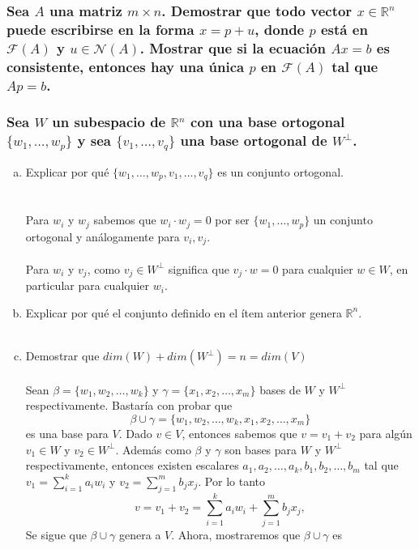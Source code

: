 \documentclass{article}
\begin{document}
\subsubsection{Sea $A$ una matriz $m \times n$. Demostrar que todo vector $x \in \mathbb{R}^n$ puede escribirse en la forma
$x = p+u$, donde $p$ está en $\mathcal{F}(A)$ y $u \in \mathcal{N}(A)$. Mostrar que si la ecuación $Ax = b$ es consistente,
entonces hay una única $p$ en $\mathcal{F}(A)$ tal que $Ap = b$.}

\subsubsection{Sea $W$ un subespacio de $\mathbb{R}^n$ con una base ortogonal $\{ w_1,\dots,w_p \}$ y sea 
$\{ v_1,\dots,v_q \}$ una base ortogonal de $W^\bot$.}
\begin{enumerate}[a.]
\item
	Explicar por qué $\{ w_1,\dots,w_p,v_1,\dots,v_q \}$ es un conjunto ortogonal. \\ \\ \\
	Para $w_i$ y $w_j$ sabemos que $w_i \cdot w_j = 0$ por ser $\{ w_1,\dots,w_p \}$ un conjunto ortogonal y análogamente
	para $v_i,v_j$. \\ \\ Para $w_i$ y $v_j$, como $v_j \in W^\bot$ significa que $v_j \cdot w = 0$ para cualquier $w \in W$,
	en particular para cualquier $w_i$. 
\item
	Explicar por qué el conjunto definido en el ítem anterior genera $\mathbb{R}^n$. \\ \\ 
\item
	Demostrar que $dim(W)+dim(W^\bot)=n = dim(V)$ \\ \\
	Sean $\beta = \{ w_1,w_2,\dots,w_k \}$ y $\gamma = \{ x_1,x_2,\dots,x_m \}$ bases de $W$ y $W^\bot$
	respectivamente. Bastaría con probar que
	\[
	\beta \cup \gamma = \{ w_1,w_2,\dots,w_k,x_1,x_2,\dots,x_m  \}
	\]
	es una base para $V$. Dado $v \in V$, entonces sabemos que $v = v_1+v_2$ para algún $v_1 \in W$ y 
	$v_2 \in W^\bot$. Además como $\beta$ y $\gamma$ son bases para $W$ y $W^\bot$ respectivamente,
	entonces existen escalares $a_1,a_2,\dots,a_k,b_1,b_2,\dots,b_m$ tal que
	$v_1 = \sum_{i=1}^{k}{a_iw_i}$ y $v_2 = \sum_{j=1}^{m}{b_jx_j}$. Por lo tanto
	\[
	v = v_1+v_2 = \sum_{i=1}^{k}{a_iw_i} + \sum_{j=1}^{m}{b_jx_j},
	\]
	Se sigue que $\beta \cup \gamma$ genera a $V$. Ahora, mostraremos que $\beta \cup \gamma$ es

\end{enumerate}
\end{document}
